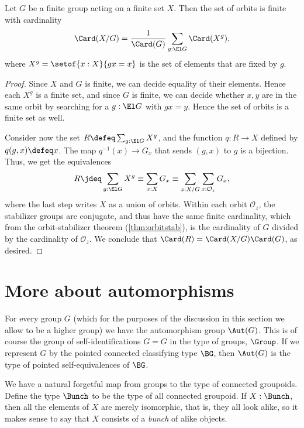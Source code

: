 \begin{lemma}
  \label{lem:burnside}
  Let $G$ be a finite group acting on a finite set $X$.
  Then the set of orbits is finite with cardinality
  \[
    \Card(X/G) = \frac1{\Card(G)}\sum_{g:\El G}\Card(X^g),
  \]
  where $X^g = \setof{x:X}{gx=x}$ is the set of elements
  that are fixed by $g$.
\end{lemma}
\begin{proof}
  Since $X$ and $G$ is finite, we can decide equality of their elements.
  Hence each $X^g$ is a finite set, and since $G$ is finite,
  we can decide whether $x,y$ are in the same orbit by searching
  for a $g : \El G$ with $gx = y$.
  Hence the set of orbits is a finite set as well.

  Consider now the set $R \defeq \sum_{g:\El G} X^g$,
  and the function $q : R \to X$
  defined by $q(g,x) \defeq x$.
  The map $q^{-1}(x) \to G_x$ that sends $(g,x)$ to $g$ is a bijection.
  Thus, we get the equivalences
  \[
    R \jdeq \sum_{g:\El G} X^g \equiv \sum_{x:X} G_x
    \equiv \sum_{z:X/G} \sum_{x : \mathcal O_z} G_x,
  \]
  where the last step writes $X$ as a union of orbits.
  Within each orbit $\mathcal O_z$,
  the stabilizer groups are conjugate,
  and thus have the same finite cardinality,
  which from the orbit-stabilizer theorem (\cref{thm:orbitstab}),
  is the cardinality of $G$ divided by the cardinality of $\mathcal O_z$.
  We conclude that $\Card(R) = \Card(X/G)\Card(G)$, as desired.
\end{proof}

\section{More about automorphisms}
\label{sec:automorphisms}

For every group $G$ (which for the purposes of the discussion
in this section we allow to be a higher group)
we have the automorphism group $\Aut(G)$.
This is of course the group of self-identifications $G = G$ in the type of groups, $\Group$.
If we represent $G$ by the pointed connected classifying type $\BG$,
then $\Aut(G)$ is the type of pointed self-equivalences of $\BG$.

We have a natural forgetful map from groups to the type of connected groupoids.
Define the type $\Bunch$ to be the type of all connected groupoid.
If $X:\Bunch$, then all the elements of $X$ are merely isomorphic,
that is, they all look alike,
so it makes sense to say that $X$ consists of a \emph{bunch} of alike objects.

